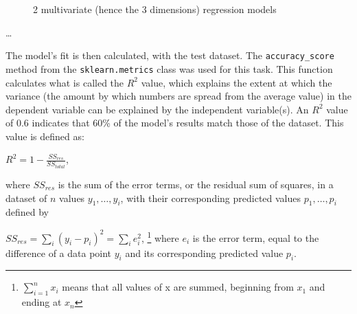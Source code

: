 \documentclass[11pt,letterpaper]{article}
\begin{document}
\begin{figure}[h]
    \centering
    \qquad
    \caption{2 multivariate (hence the 3 dimensions) regression models}
    \label{fig:example}
\end{figure}


\dots

The model's fit is then calculated, with the test dataset. The \verb|accuracy_score| method 
from the \verb|sklearn.metrics| class was used for this task. This function calculates what 
is called the $R^2$ value, which explains the extent at which the variance (the amount by which numbers 
are spread from the average value) in the dependent variable can be explained by the independent 
variable(s). An $R^2$ value of 0.6 indicates that 60\% of the model's results match those of the 
dataset. This value is defined as: 

$R^2 = 1 - \frac{SS_{res}}{SS_{total}}$,

where $SS_{res}$ is the sum of the error terms, or the residual sum of squares, in a dataset of $n$ 
values $y_1,\dots, y_i$, with their corresponding predicted values $p_1,\dots, p_i$ defined by 

$SS_{res} = \sum_{i} (y_i - p_i)^2 = \sum_{i} e_i^2$, \footnote{$\sum_{i=1}^n x_i$ means that all values of 
x are summed, beginning from $x_1$ and ending at $x_n$} where $e_i$ is the error term, equal to the difference of a data point $y_i$ 
and its corresponding predicted value $p_i$.
\end{document}
